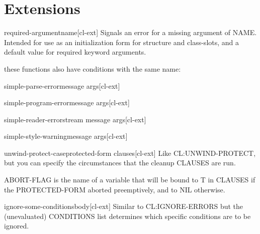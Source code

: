 \section{Extensions}
\label{sec:extensions}

\begin{function}{required-argument}{\op name}[cl-ext]
  Signals an error for a missing argument of NAME. Intended for
use as an initialization form for structure and class-slots, and
a default value for required keyword arguments.
\end{function}

these functions also have conditions with the same name:

\begin{function}{simple-parse-error}{message \rest args}[cl-ext]
  
\end{function}

\begin{function}{simple-program-error}{message \rest args}[cl-ext]
  
\end{function}

\begin{function}{simple-reader-error}{stream message \rest args}[cl-ext]
  
\end{function}

\begin{function}{simple-style-warning}{message \rest args}[cl-ext]
  
\end{function}

\begin{macro}{unwind-protect-case}{\op protected-form \body clauses}[cl-ext]
  Like CL:UNWIND-PROTECT, but you can specify the circumstances that
the cleanup CLAUSES are run.

ABORT-FLAG is the name of a variable that will be bound to T in
CLAUSES if the PROTECTED-FORM aborted preemptively, and to NIL
otherwise.
\end{macro}

\begin{macro}{ignore-some-conditions}{\rest \body body}[cl-ext]
  Similar to CL:IGNORE-ERRORS but the (unevaluated) CONDITIONS
list determines which specific conditions are to be ignored.
\end{macro}

